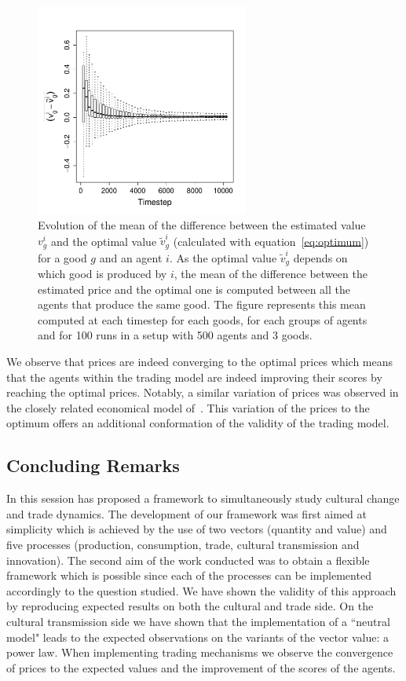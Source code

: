 \documentclass[a4paper]{article}
\begin{document}
\begin{figure}[!h]
	\begin{center}
		\includegraphics[width=7cm]{img/ClearingPriceDistanceEvolutionForTrade-G3N500.pdf}
	\end{center}
	\caption{Evolution of the mean of the difference between the estimated value $v^i_g$ and the optimal value $\tilde{v}^i_g$ (calculated with equation~\ref{eq:optimum}) for a good $g$ and an agent $i$. As the optimal value $\tilde{v}^i_g$ depends on which good is produced by $i$, the mean of the difference between the estimated price and the optimal one is computed between all the agents that produce the same good. The figure represents this mean computed at each timestep for each goods, for each groups of agents and for 100 runs in a setup with 500 agents and 3 goods. }
	\label{fig:ratioEvol}
\end{figure}

We observe that prices are indeed converging to the optimal prices which means that the agents within the trading model are indeed improving their scores by reaching the optimal prices. Notably, a similar variation of prices was observed in the closely related economical model of~\cite{gintis_emergence_2006}. This variation of the prices to the optimum offers an additional conformation of the validity of the trading model. 

\subsection{Concluding Remarks}

In this session has proposed a framework to simultaneously study cultural change and trade dynamics. The development of our framework was first aimed at simplicity which is achieved by the use of two vectors (quantity and value) and five processes (production, consumption, trade, cultural transmission and innovation). The second aim of the work conducted was to obtain a flexible framework which is possible since each of the processes can be implemented accordingly to the question studied. We have shown the validity of this approach by reproducing expected results on both the cultural and trade side. On the cultural transmission side we have shown that the implementation of a ``neutral model" leads to the expected observations on the variants of the vector value: a power law. When implementing trading mechanisms we observe the convergence of prices to the expected values and the improvement of the scores of the agents.
\end{document}
